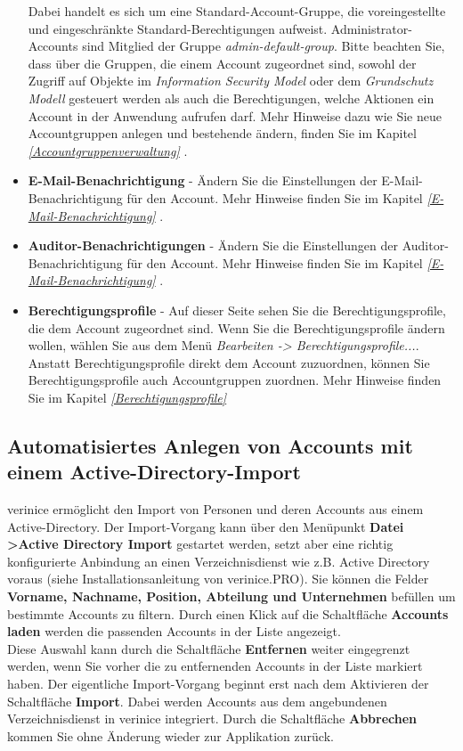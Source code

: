 \documentclass[a4paper,10pt]{book}
\begin{document}
\begin{itemize}
Dabei handelt es sich um eine Standard-Account-Gruppe, die voreingestellte und eingeschränkte Standard-Berechtigungen aufweist. Administrator-Accounts sind Mitglied der Gruppe \textit{admin-default-group}. Bitte beachten Sie, dass über die Gruppen, die einem Account zugeordnet sind, sowohl der Zugriff auf Objekte im \textit{Information Security Model} oder dem \textit{Grundschutz Modell} gesteuert werden als auch die Berechtigungen, welche Aktionen ein Account in der Anwendung aufrufen darf. Mehr Hinweise dazu wie Sie neue Accountgruppen anlegen und bestehende ändern,
finden Sie im Kapitel {\em \ref{Accountgruppenverwaltung} }.
\item \textbf{E-Mail-Benachrichtigung} - Ändern Sie die Einstellungen der E-Mail-Benachrichtigung für den Account. Mehr Hinweise finden Sie im Kapitel {\em \ref{E-Mail-Benachrichtigung} }.
\item \textbf{Auditor-Benachrichtigungen} - Ändern Sie die Einstellungen der Auditor-Benachrichtigung für den Account. Mehr Hinweise finden Sie im Kapitel {\em \ref{E-Mail-Benachrichtigung} }.
\item \textbf{Berechtigungsprofile} - Auf dieser Seite sehen Sie die Berechtigungsprofile, die dem Account zugeordnet sind. Wenn Sie die Berechtigungsprofile ändern wollen, wählen Sie aus dem Menü \textit{Bearbeiten -> Berechtigungsprofile...}. Anstatt Berechtigungsprofile direkt dem Account zuzuordnen, können Sie Berechtigungsprofile auch Accountgruppen zuordnen. Mehr Hinweise finden Sie im Kapitel {\em \ref{Berechtigungsprofile} }
\end{itemize}

\subsection{Automatisiertes Anlegen von Accounts mit einem Active-Directory-Import} \label{Automatisiertes Anlegen von Accounts mit einem Active-Directory-Import}
verinice ermöglicht den Import von Personen und deren Accounts aus einem Active-Directory. Der Import-Vorgang kann über den Menüpunkt
\textbf{Datei \textgreater Active Directory Import} gestartet werden, setzt aber eine richtig konfigurierte Anbindung an einen Verzeichnisdienst wie z.B.
Active Directory voraus (siehe Installationsanleitung von verinice.\textsc{PRO}). Sie können die Felder \textbf{Vorname, Nachname, Position, Abteilung
und Unternehmen} befüllen um bestimmte Accounts zu filtern. Durch einen Klick auf die Schaltfläche \textbf{Accounts laden} werden die passenden
Accounts in der Liste angezeigt.
\newline\\
Diese Auswahl kann durch die Schaltfläche \textbf{Entfernen} weiter eingegrenzt werden, wenn Sie vorher die zu entfernenden Accounts in der
Liste markiert haben. Der eigentliche Import-Vorgang beginnt erst nach dem Aktivieren der Schaltfläche \textbf{Import}. Dabei werden Accounts
aus dem angebundenen Verzeichnisdienst in verinice integriert. Durch die Schaltfläche \textbf{Abbrechen} kommen Sie ohne Änderung wieder zur Applikation zurück.
\end{document}
